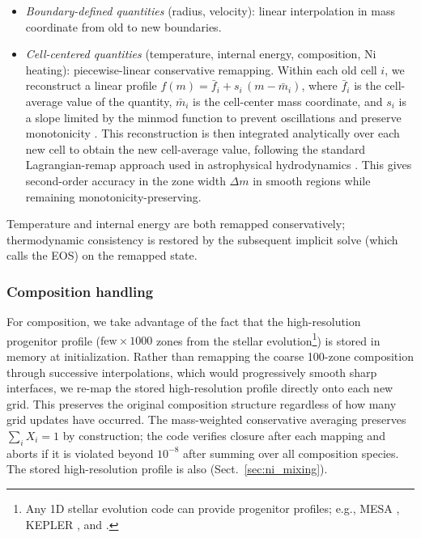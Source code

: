 \documentclass[twocolumn,linenumbers]{aastex701}
\begin{document}
\begin{itemize}
\item \textit{Boundary-defined quantities} (radius, velocity): linear interpolation in mass coordinate from old to new boundaries.
\item \textit{Cell-centered quantities} (temperature, internal energy, composition, Ni heating): piecewise-linear conservative remapping. Within each old cell $i$, we reconstruct a linear profile $f(m) = \bar{f}_i + s_i\,(m - \bar{m}_i)$, where $\bar{f}_i$ is the cell-average value of the quantity, $\bar{m}_i$ is the cell-center mass coordinate, and $s_i$ is a slope limited by the minmod function to prevent oscillations and preserve monotonicity \citep{vanLeer1979,Sweby1984}. This reconstruction is then integrated analytically over each new cell to obtain the new cell-average value, following the standard Lagrangian-remap approach used in astrophysical hydrodynamics \citep{Blondin1993}. This gives second-order accuracy in the zone width $\Delta m$ in smooth regions while remaining monotonicity-preserving.
\end{itemize}

Temperature and internal energy are both remapped conservatively; thermodynamic consistency is restored by the subsequent implicit solve (which calls the EOS) on the remapped state. 

\subsubsection{Composition handling}
For composition, we take advantage of the fact that the high-resolution progenitor profile ($\mathrm{few}\times1000$ zones from the stellar evolution\footnote{Any 1D stellar evolution code can provide progenitor profiles; e.g., MESA \citep{Paxton2011}, KEPLER \citep{WoosleyWeaver1995}, and .}) is stored in memory at initialization. Rather than remapping the coarse 100-zone composition through successive interpolations, which would progressively smooth sharp interfaces, we re-map the stored high-resolution profile directly onto each new grid. This preserves the original composition structure regardless of how many grid updates have occurred. The mass-weighted conservative averaging preserves $\sum_i X_i = 1$ by construction; the code verifies closure after each mapping and aborts if it is violated beyond $10^{-8}$ after summing over all composition species. The stored high-resolution profile is also  (Sect.~\ref{sec:ni_mixing}).
\end{document}
